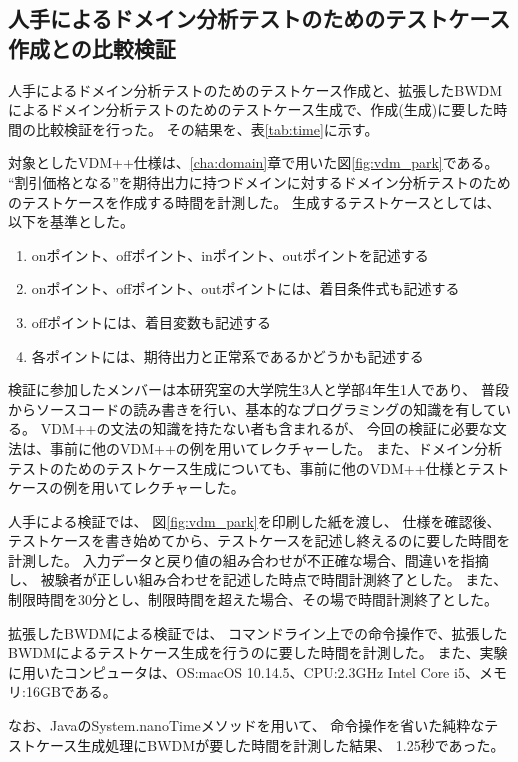 \documentclass[uplatex, report, a4j, 10pt]{jsbook}
\begin{document}
\subsection{人手によるドメイン分析テストのためのテストケース作成との比較検証}

人手によるドメイン分析テストのためのテストケース作成と、拡張したBWDMによるドメイン分析テストのためのテストケース生成で、作成(生成)に要した時間の比較検証を行った。
その結果を、表\ref{tab:time}に示す。

対象としたVDM++仕様は、\ref{cha:domain}章で用いた図\ref{fig:vdm_park}である。
“割引価格となる”を期待出力に持つドメインに対するドメイン分析テストのためのテストケースを作成する時間を計測した。
生成するテストケースとしては、以下を基準とした。
\begin{enumerate}
  \item onポイント、offポイント、inポイント、outポイントを記述する
  \item onポイント、offポイント、outポイントには、着目条件式も記述する
  \item offポイントには、着目変数も記述する
  \item 各ポイントには、期待出力と正常系であるかどうかも記述する
\end{enumerate}

検証に参加したメンバーは本研究室の大学院生3人と学部4年生1人であり、
普段からソースコードの読み書きを行い、基本的なプログラミングの知識を有している。
VDM++の文法の知識を持たない者も含まれるが、
今回の検証に必要な文法は、事前に他のVDM++の例を用いてレクチャーした。
また、ドメイン分析テストのためのテストケース生成についても、事前に他のVDM++仕様とテストケースの例を用いてレクチャーした。

人手による検証では、
図\ref{fig:vdm_park}を印刷した紙を渡し、
仕様を確認後、
テストケースを書き始めてから、テストケースを記述し終えるのに要した時間を計測した。
入力データと戻り値の組み合わせが不正確な場合、間違いを指摘し、
被験者が正しい組み合わせを記述した時点で時間計測終了とした。
また、制限時間を30分とし、制限時間を超えた場合、その場で時間計測終了とした。

拡張したBWDMによる検証では、
コマンドライン上での命令操作で、拡張したBWDMによるテストケース生成を行うのに要した時間を計測した。
また、実験に用いたコンピュータは、OS:macOS 10.14.5、CPU:2.3GHz Intel Core i5、メモリ:16GBである。

なお、JavaのSystem.nanoTime\cite{nanotime}メソッドを用いて、
命令操作を省いた純粋なテストケース生成処理にBWDMが要した時間を計測した結果、
1.25秒であった。
\end{document}
